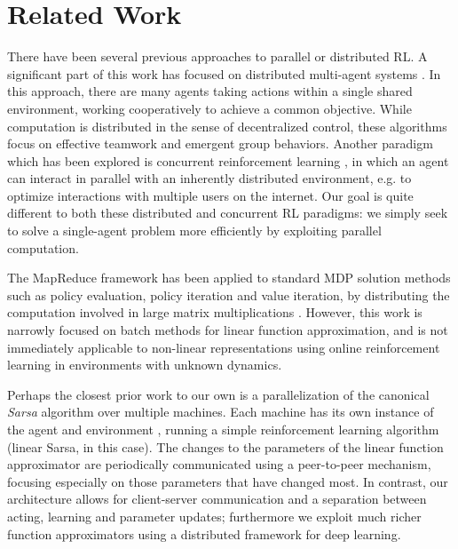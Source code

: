 \section{Related Work}

There have been several previous approaches to parallel or distributed RL. A significant part of this work has focused on distributed multi-agent systems \cite{weiss:distributedRL,lauer:distributedRL}. In this approach, there are many agents taking actions within a single shared environment, working cooperatively to achieve a common objective. While computation is distributed in the sense of decentralized control, these algorithms focus on effective teamwork and emergent group behaviors. Another paradigm which has been explored is concurrent reinforcement learning \cite{silver:concurrentRL}, in which an agent can interact in parallel with an inherently distributed environment, e.g. to optimize interactions with multiple users on the internet. Our goal is quite different to both these distributed and concurrent RL paradigms: we simply seek to solve a single-agent problem more efficiently by exploiting parallel computation. 

The MapReduce framework has been applied to standard MDP solution methods such as policy evaluation, policy iteration and value iteration, by distributing the computation involved in large matrix multiplications \cite{li:mapreduce}. However, this work is narrowly focused on batch methods for linear function approximation, and is not immediately applicable to non-linear representations using online reinforcement learning in environments with unknown dynamics.

Perhaps the closest prior work to our own is a parallelization of the canonical \emph{Sarsa} algorithm over multiple machines. Each machine has its own instance of the agent and environment \cite{grounds:parallelRL}, running a simple reinforcement learning algorithm (linear Sarsa, in this case). The changes to the parameters of the linear function approximator are periodically communicated using a peer-to-peer mechanism, focusing especially on those parameters that have changed most. In contrast, our architecture allows for client-server communication and a separation between acting, learning and parameter updates; furthermore we exploit much richer function approximators using a distributed framework for deep learning.
